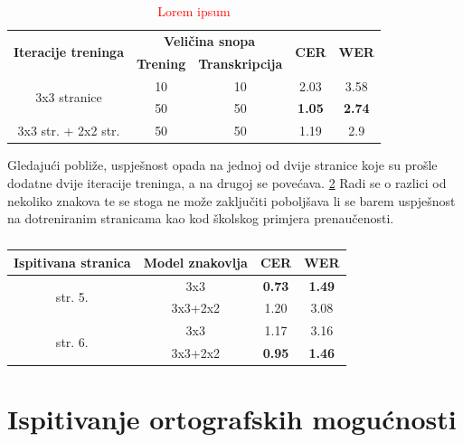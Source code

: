 \documentclass[zavrsnirad]{fer}
\begin{document}
\bgroup
\def\arraystretch{1.25}
\begin{table}[h]
	\centering
	\begin{tabular}{|c|c|c|c|c|}
		\hline
		\multirow{2}{*}{\textbf{Iteracije treninga}} & \multicolumn{2}{c|}{\textbf{Veličina snopa}} & \multicolumn{1}{c|}{\multirow{2}{*}{\textbf{CER}}} & \multicolumn{1}{c|}{\multirow{2}{*}{\textbf{WER}}} \\ \cline{2-3}
		
		& \textbf{Trening}  & \textbf{Transkripcija}  & \multicolumn{1}{c|}{}  & \multicolumn{1}{c|}{}  \\ \hline
		\multirow{2}{*}{3x3 stranice} & 10 & 10 & 2.03 & 3.58  \\ \cline{2-5}
		 		& 50  & 50 & \textbf{1.05} & \textbf{2.74}   \\ \hline
		3x3 str. + 2x2 str. & 50 & 50 & 1.19 & 2.9 \\ \hline                                              
	\end{tabular}
	\caption{\textcolor{red}{Lorem ipsum}}
	\label{tab:7.3}
\end{table}
\egroup


Gledajući pobliže, uspješnost opada na jednoj od dvije stranice koje su prošle dodatne dvije iteracije treninga, a na drugoj se povećava. \ref{tab:pages5and6} Radi se o razlici od nekoliko znakova te se stoga ne može zaključiti poboljšava li se barem uspješnost na dotreniranim stranicama kao kod školskog primjera prenaučenosti.


\bgroup
\def\arraystretch{1.25}
\begin{table}[hbt]
	\centering
	\begin{tabular}{|c|c|c|c|}
		\hline
		\textbf{Ispitivana stranica} & \textbf{Model znakovlja} & \textbf{CER} & \textbf{WER} \\ \hline
		\multirow{2}{*}{str. 5.} & 3x3 & \textbf{0.73} & \textbf{1.49} \\ \cline{2-4}
								 & 3x3+2x2 & 1.20 & 3.08 \\ \hline
		\multirow{2}{*}{str. 6.} & 3x3 & 1.17 & 3.16 \\ \cline{2-4}
								 & 3x3+2x2 & \textbf{0.95} & \textbf{1.46} \\ \hline
	\end{tabular}
	\caption{}
	\label{tab:pages5and6}
\end{table}
\egroup

\FloatBarrier

\section{Ispitivanje ortografskih mogućnosti}
\end{document}
